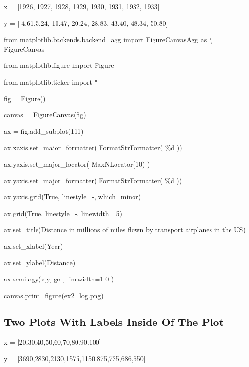\documentclass[12pt,twoside]{book}
\begin{document}
\bigskip

x = [1926, 1927, 1928, 1929, 1930, 1931, 1932, 1933]

y = [ 4.61,5.24, 10.47, 20.24, 28.83, 43.40, 48.34, 50.80]


\bigskip

from matplotlib.backends.backend\_agg import FigureCanvasAgg as
{\textbackslash} FigureCanvas

from matplotlib.figure import Figure

from matplotlib.ticker import *

fig = Figure()

canvas = FigureCanvas(fig)

ax = fig.add\_subplot(111)

ax.xaxis.set\_major\_formatter( FormatStrFormatter(
{\textquotesingle}\%d{\textquotesingle} ))

ax.yaxis.set\_major\_locator( MaxNLocator(10) )

ax.yaxis.set\_major\_formatter( FormatStrFormatter(
{\textquotesingle}\%d{\textquotesingle} ))

ax.yaxis.grid(True, linestyle={\textquotesingle}{}-{\textquotesingle},
which={\textquotesingle}minor{\textquotesingle})

ax.grid(True, linestyle={\textquotesingle}{}-{\textquotesingle},
linewidth=.5)

ax.set\_title({\textquotesingle}Distance in millions of miles flown by
transport airplanes in the US{\textquotesingle})

ax.set\_xlabel({\textquotesingle}Year{\textquotesingle})

ax.set\_ylabel({\textquotesingle}Distance{\textquotesingle})

ax.semilogy(x,y, {\textquotesingle}go{}-{\textquotesingle},
linewidth=1.0 )

canvas.print\_figure({\textquotesingle}ex2\_log.png{\textquotesingle})

{\textbar}


\bigskip

\subsection[Two Plots With Labels Inside Of The Plot]{
Two Plots With Labels Inside Of The Plot}

\bigskip

x = [20,30,40,50,60,70,80,90,100]

y = [3690,2830,2130,1575,1150,875,735,686,650]
\end{document}
